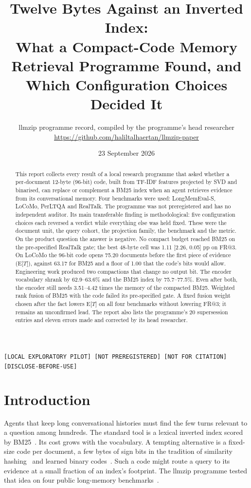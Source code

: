 \documentclass[11pt,a4paper]{article}
\title{Twelve Bytes Against an Inverted Index:\\ What a Compact-Code Memory Retrieval Programme Found, and Which Configuration Choices Decided It}
\author{llmzip programme record, compiled by the programme's head researcher\\ \small \url{https://github.com/haliltalhaertan/llmzip-paper}}
\date{23 September 2026}
\makeatletter
\newcommand{\FR}{FR@3}
\newcommand{\ET}{E[$T$]}
\newcommand{\labels}{\texttt{[LOCAL EXPLORATORY PILOT] [NOT PREREGISTERED] [NOT FOR CITATION] [DISCLOSE-BEFORE-USE]}}
\makeatother
\begin{document}
\maketitle
\begin{center}\small\labels\end{center}

\begin{abstract}
\noindent
This report collects every result of a local research programme that asked whether a per-document 12-byte (96-bit) code, built from TF-IDF features projected by SVD and binarised, can replace or complement a BM25 index when an agent retrieves evidence from its conversational memory. Four benchmarks were used: LongMemEval-S, LoCoMo, PerLTQA and RealTalk. The programme was not preregistered and has no independent auditor. Its main transferable finding is methodological: five configuration choices each reversed a verdict while everything else was held fixed. These were the document unit, the query cohort, the projection family, the benchmark and the metric. On the product question the answer is negative. No compact budget reached BM25 on the pre-specified RealTalk gate; the best 48-byte cell was \textminus{}1.11 [\textminus{}2.26, 0.05] pp on \FR{}. On LoCoMo the 96-bit code opens 75.20 documents before the first piece of evidence (\ET{}), against 63.17 for BM25 and a floor of 1.00 that the code's bits would allow. Engineering work produced two compactions that change no output bit. The encoder vocabulary shrank by 62.9--63.6\% and the BM25 index by 75.7--77.5\%. Even after both, the encoder still needs 3.51--4.42 times the memory of the compacted BM25. Weighted rank fusion of BM25 with the code failed its pre-specified gate. A fixed fusion weight chosen after the fact lowers \ET{} on all four benchmarks without lowering \FR{}; it remains an unconfirmed lead. The report also lists the programme's 20 supersession entries and eleven errors made and corrected by its head researcher.
\end{abstract}

\section{Introduction}
Agents that keep long conversational histories must find the few turns relevant to a question among hundreds. The standard tool is a lexical inverted index scored by BM25~\citep{robertson2009bm25}. Its cost grows with the vocabulary. A tempting alternative is a fixed-size code per document, a few bytes of sign bits in the tradition of similarity hashing~\citep{charikar2002simhash,datar2004lsh} and learned binary codes~\citep{gong2013itq,jegou2011pq,ge2014opq,gao2024rabitq}. Such a code might route a query to its evidence at a small fraction of an index's footprint. The llmzip programme tested that idea on four public long-memory benchmarks~\citep{wu2024longmemeval,maharana2024locomo,du2024perltqa,lee2025realtalk}.
\end{document}
